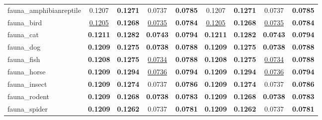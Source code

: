 \begin{center}
\begin{supertabular}{lcccc||cccc}
\small{fauna\_amphibianreptile} & {\scriptsize{0.1207}} & \textbf{\scriptsize{0.1271}} & {\scriptsize{0.0737}} & \textbf{\scriptsize{0.0785}}& {\scriptsize{0.1207}} & \textbf{\scriptsize{0.1271}} & {\scriptsize{0.0737}} & \textbf{\scriptsize{0.0785}}\\
\small{fauna\_bird} & \underline{\scriptsize{0.1205}} & \textbf{\scriptsize{0.1268}} & \underline{\scriptsize{0.0735}} & \textbf{\scriptsize{0.0784}}& \underline{\scriptsize{0.1205}} & \textbf{\scriptsize{0.1268}} & \underline{\scriptsize{0.0735}} & \textbf{\scriptsize{0.0784}}\\
\small{fauna\_cat} & \textbf{\scriptsize{0.1211}} & \textbf{\scriptsize{0.1282}} & \textbf{\scriptsize{0.0743}} & \textbf{\scriptsize{0.0794}}& \textbf{\scriptsize{0.1211}} & \textbf{\scriptsize{0.1282}} & \textbf{\scriptsize{0.0743}} & \textbf{\scriptsize{0.0794}}\\
\small{fauna\_dog} & \textbf{\scriptsize{0.1209}} & \textbf{\scriptsize{0.1275}} & \textbf{\scriptsize{0.0738}} & \textbf{\scriptsize{0.0788}}& \textbf{\scriptsize{0.1209}} & \textbf{\scriptsize{0.1275}} & \textbf{\scriptsize{0.0738}} & \textbf{\scriptsize{0.0788}}\\
\small{fauna\_fish} & \textbf{\scriptsize{0.1208}} & \textbf{\scriptsize{0.1275}} & \underline{\scriptsize{0.0734}} & \textbf{\scriptsize{0.0788}}& \textbf{\scriptsize{0.1208}} & \textbf{\scriptsize{0.1275}} & \underline{\scriptsize{0.0734}} & \textbf{\scriptsize{0.0788}}\\
\small{fauna\_horse} & \textbf{\scriptsize{0.1209}} & \textbf{\scriptsize{0.1294}} & \underline{\scriptsize{0.0736}} & \textbf{\scriptsize{0.0794}}& \textbf{\scriptsize{0.1209}} & \textbf{\scriptsize{0.1294}} & \underline{\scriptsize{0.0736}} & \textbf{\scriptsize{0.0794}}\\
\small{fauna\_insect} & \textbf{\scriptsize{0.1209}} & \textbf{\scriptsize{0.1274}} & {\scriptsize{0.0737}} & \textbf{\scriptsize{0.0786}}& \textbf{\scriptsize{0.1209}} & \textbf{\scriptsize{0.1274}} & {\scriptsize{0.0737}} & \textbf{\scriptsize{0.0786}}\\
\small{fauna\_rodent} & \textbf{\scriptsize{0.1209}} & \textbf{\scriptsize{0.1268}} & \textbf{\scriptsize{0.0738}} & \textbf{\scriptsize{0.0783}}& \textbf{\scriptsize{0.1209}} & \textbf{\scriptsize{0.1268}} & \textbf{\scriptsize{0.0738}} & \textbf{\scriptsize{0.0783}}\\
\small{fauna\_spider} & \textbf{\scriptsize{0.1209}} & \textbf{\scriptsize{0.1262}} & {\scriptsize{0.0737}} & \textbf{\scriptsize{0.0781}}& \textbf{\scriptsize{0.1209}} & \textbf{\scriptsize{0.1262}} & {\scriptsize{0.0737}} & \textbf{\scriptsize{0.0781}}\\

\end{supertabular}
\end{center}
